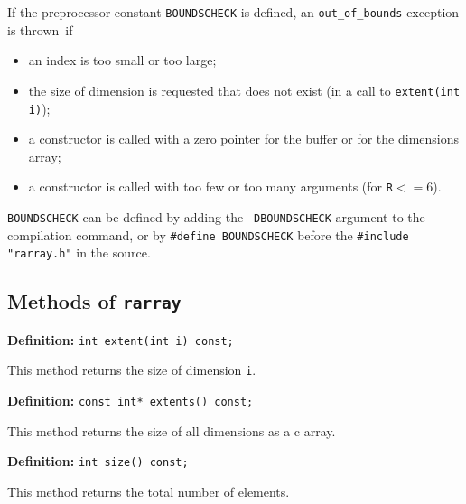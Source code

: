 \documentclass[12pt,twoside]{article}
\begin{document}
If the preprocessor constant \texttt{{\tt BOUNDSCHECK}} is defined, an
\texttt{out\_of\_bounds} exception is thrown~if
\begin{itemize}\itemsep0pt\parskip3pt
\item an index is too small or too large;
\item the size of dimension is requested that does not exist (in a call to \texttt{extent(int i)});
\item a constructor is called with a zero pointer for the buffer or for the dimensions array;
\item a constructor is called with too few or too many arguments (for \texttt{R}$<=6$).
\end{itemize}
\texttt{{\tt BOUNDSCHECK}} can be defined by
adding the {\tt -DBOUNDSCHECK} argument to the compilation command, or
by \texttt{{\tt\#define BOUNDSCHECK}} before
the \texttt{{\tt\#include "rarray.h"}} in the source.

\subsection{Methods of {\tt rarray}}

\noindent\textbf{Definition:} \texttt{int extent(int i) const;}

This method returns the size of dimension \texttt{i}.

\noindent\textbf{Definition:} \texttt{const int* extents() const;}

This method returns the size of all dimensions as a c array. 

\noindent\textbf{Definition:} \texttt{int size() const;}

This method returns the total number of elements.
\end{document}

